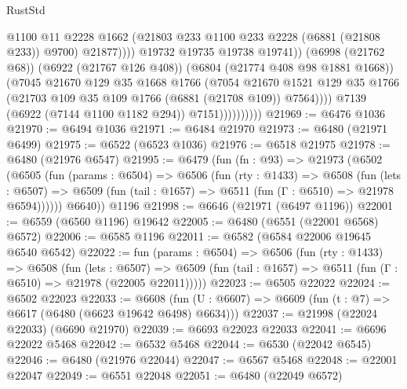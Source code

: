 \begin{lexlean}{RustStd}
\begin{coremodule}
                                      @1100
                                      @11
                                      @2228
                                      @1662
                                      (@21803 @233 @1100 @233 @2228 (@6881 (@21808 @233)) @9700)
                                      @21877))))
                              @19732
                              @19735
                              @19738
                              @19741))
                          (@6998 (@21762 @68))
                          (@6922 (@21767 @126 @408))
                          (@6804 (@21774 @408 @98 @1881 @1668))
                          (@7045
                            @21670
                            @129
                            @35
                            @1668
                            @1766
                            (@7054
                              @21670
                              @1521
                              @129
                              @35
                              @1766
                              (@21703 @109 @35 @109 @1766 (@6881 (@21708 @109)) @7564))))
                        @7139
                        (@6922 (@7144 @1100 @1182 @294))
                        @7151))))))))))
@21969 := @6476 @1036
@21970 := @6494 @1036
@21971 := @6484 @21970
@21973 := @6480 (@21971 @6499)
@21975 := @6522 (@6523 @1036)
@21976 := @6518 @21975
@21978 := @6480 (@21976 @6547)
@21995 := @6479
    (fun (fn : @93) =>
    @21973
      (@6502
        (@6505
          (fun (params : @6504) =>
          @6506
            (fun (rty : @1433) =>
            @6508
              (fun (lets : @6507) =>
              @6509 (fun (tail : @1657) => @6511 (fun (Γ : @6510) => @21978 @6594))))))
        @6640))
    @1196
@21998 := @6646 (@21971 (@6497 @1196))
@22001 := @6559 (@6560 @1196) @19642
@22005 := @6480 (@6551 (@22001 @6568) @6572)
@22006 := @6585 @1196
@22011 := @6582 (@6584 @22006 @19645 @6540 @6542)
@22022 := fun (params : @6504) =>
  @6506
    (fun (rty : @1433) =>
    @6508
      (fun (lets : @6507) =>
      @6509 (fun (tail : @1657) => @6511 (fun (Γ : @6510) => @21978 (@22005 @22011)))))
@22023 := @6505 @22022
@22024 := @6502 @22023
@22033 := @6608
    (fun (U : @6607) => @6609 (fun (t : @7) => @6617 (@6480 (@6623 @19642 @6498) @6634)))
@22037 := @21998 (@22024 @22033) (@6690 @21970)
@22039 := @6693 @22023 @22033
@22041 := @6696 @22022 @5468
@22042 := @6532 @5468
@22044 := @6530 (@22042 @6545)
@22046 := @6480 (@21976 @22044)
@22047 := @6567 @5468
@22048 := @22001 @22047
@22049 := @6551 @22048
@22051 := @6480 (@22049 @6572)

\end{coremodule}
\end{lexlean}
